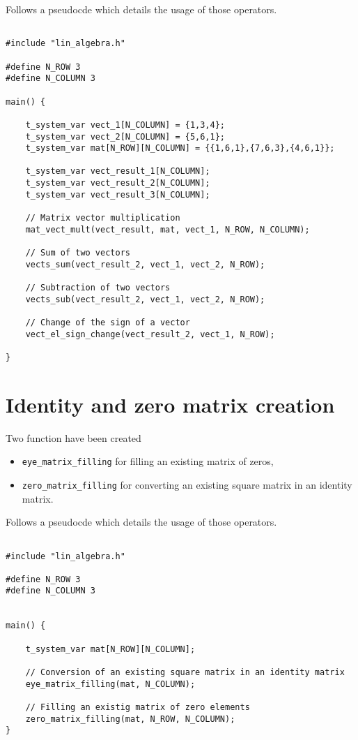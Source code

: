 \documentclass[12pt]{Template_}
\begin{document}
Follows a pseudocde which details the usage of those operators.

\begin{verbatim}

#include "lin_algebra.h"

#define N_ROW 3
#define N_COLUMN 3

main() {

    t_system_var vect_1[N_COLUMN] = {1,3,4};
    t_system_var vect_2[N_COLUMN] = {5,6,1};
    t_system_var mat[N_ROW][N_COLUMN] = {{1,6,1},{7,6,3},{4,6,1}};

    t_system_var vect_result_1[N_COLUMN];
    t_system_var vect_result_2[N_COLUMN];
    t_system_var vect_result_3[N_COLUMN];

    // Matrix vector multiplication
    mat_vect_mult(vect_result, mat, vect_1, N_ROW, N_COLUMN);

    // Sum of two vectors
    vects_sum(vect_result_2, vect_1, vect_2, N_ROW);

    // Subtraction of two vectors
    vects_sub(vect_result_2, vect_1, vect_2, N_ROW);

    // Change of the sign of a vector
    vect_el_sign_change(vect_result_2, vect_1, N_ROW);

}
\end{verbatim}

\section{Identity and zero matrix creation}
Two function have been created
\begin{itemize}
\item \verb~eye_matrix_filling~ for filling an existing matrix of zeros,
\item \verb~zero_matrix_filling~ for converting an existing square matrix in an identity matrix.
\end{itemize}

Follows a pseudocde which details the usage of those operators.

\begin{verbatim}

#include "lin_algebra.h"

#define N_ROW 3
#define N_COLUMN 3


main() {

    t_system_var mat[N_ROW][N_COLUMN];

    // Conversion of an existing square matrix in an identity matrix
    eye_matrix_filling(mat, N_COLUMN);
   
    // Filling an existig matrix of zero elements
    zero_matrix_filling(mat, N_ROW, N_COLUMN);
}

\end{verbatim}
\end{document}
